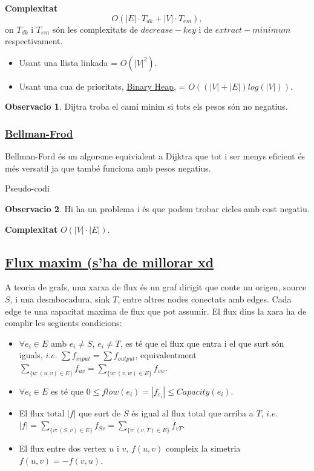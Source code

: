 \documentclass[12pt]{article}
\theoremstyle{definition}
\theoremstyle{definition}
\theoremstyle{definition}
\newtheorem{obs}{Observacio}
\theoremstyle{definition}
\theoremstyle{definition}
\theoremstyle{definition}
\theoremstyle{definition}
\begin{document}
\textbf{Complexitat}
\[
O(|E|\cdot T_{dk}+|V|\cdot T_{em}),
\]
on $T_{dk}$ i $T_{em}$ són les complexitats de $decrease-key$ i de $extract-minimum$ respectivament.
\begin{itemize}
	\item Usant una llista linkada = $O(|V|^2)$.
	\item Usant una cua de prioritats, \href{https://en.wikipedia.org/wiki/Binary_heap}{\color{blue}Binary Heap}, = $O((|V|+|E|)log(|V|))$.
\end{itemize}

\begin{obs}
Dijtra troba el camí minim si tots els pesos són no negatius.
\end{obs}

\subsubsection{\href{https://en.wikipedia.org/wiki/Bellman-Ford_algorithm}{\color{blue}\underline{Bellman-Frod}}}
Bellman-Ford és un algorsme equivialent a Dijktra que tot i ser menys eficient és més versatil ja que també funciona amb pesos negatius.

Pseudo-codi


\begin{obs}
Hi ha un problema i és que podem trobar cicles amb cost negatiu.
\end{obs}

\textbf{Complexitat} $O(|V|\cdot|E|)$.

\newpage

\subsection{\href{https://en.wikipedia.org/wiki/Maximum_flow_problem}{Flux maxim (s'ha de millorar xd}}
A teoria de grafs, una xarxa de flux és un graf dirigit que conte un origen, source $S$, i una desmbocadura, sink $T$, entre altres nodes conectats amb edges.
Cada edge te una capacitat maxima de flux que pot assumir.
El flux dins la xara ha de complir les següents condicions:
\begin{itemize}
	\item $\forall e_i\in E$ amb $e_i\neq S$, $e_i\neq T$, es té que el flux que entra i el que surt són iguals, $i.e.$ $\sum f_{input}=\sum f_{output}$, equivalentment $\sum_{\{u:(u,v)\in E\}} f_{uv}=\sum_{\{w:(v,w)\in E\}} f_{vw}$.
	\item $\forall e_i\in E$ es té que $0\leq flow(e_i)=|f_{e_i}|\leq Capacity(e_i)$.
	\item El flux total $|f|$ que surt de $S$ és igual al flux total que arriba a $T$, $i.e.$ $|f| = \sum_{\{v:(S,v)\in E\}} f_{Sv} = \sum_{\{v:(v,T)\in E\}} f_{vT}$.
	\item El flux entre dos vertex $u$ i $v$, $f(u,v)$ compleix la simetria $f(u,v)=-f(v,u)$.
\end{itemize}
\end{document}
